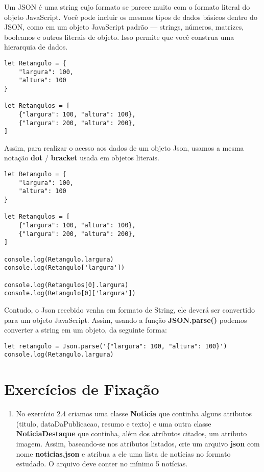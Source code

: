 Um JSON é uma string cujo formato se parece muito com o formato literal do objeto JavaScript. Você pode incluir os mesmos tipos de dados básicos dentro do JSON, como em um objeto JavaScript padrão — strings, números, matrizes, booleanos e outros literais de objeto. Isso permite que você construa uma hierarquia de dados. 

\begin{lstlisting}
let Retangulo = {
	"largura": 100,
	"altura": 100
}

let Retangulos = [
	{"largura": 100, "altura": 100},
	{"largura": 200, "altura": 200},
]
\end{lstlisting}

Assim, para realizar o acesso aos dados de um objeto Json, usamos a mesma notação \textbf{dot} / \textbf{bracket} usada em objetos literais.

\begin{lstlisting}
let Retangulo = {
	"largura": 100,
	"altura": 100
}

let Retangulos = [
	{"largura": 100, "altura": 100},
	{"largura": 200, "altura": 200},
]

console.log(Retangulo.largura)
console.log(Retangulo['largura'])

console.log(Retangulos[0].largura)
console.log(Retangulo[0]['largura'])
\end{lstlisting}

Contudo, o Json recebido venha em formato de String, ele deverá ser convertido para um objeto JavaScript. Assim, usando a função \textbf{JSON.parse()} podemos converter a string em um objeto, da seguinte forma:

\begin{lstlisting}
let retangulo = Json.parse('{"largura": 100, "altura": 100}')
console.log(Retangulo.largura)
\end{lstlisting}

\section{Exercícios de Fixação}

\begin{enumerate}
	\item No exercício 2.4 criamos uma classe \textbf{Noticia} que continha alguns atributos (titulo, dataDaPublicacao, resumo e texto) e uma outra classe \textbf{NoticiaDestaque} que continha, além dos atributos citados, um atributo imagem. Assim, baseando-se nos atributos listados, crie um arquivo \textbf{json} com nome \textbf{noticias.json} e atribua a ele uma lista de notícias no formato estudado. O arquivo deve conter no mínimo 5 notícias.
\end{enumerate}

